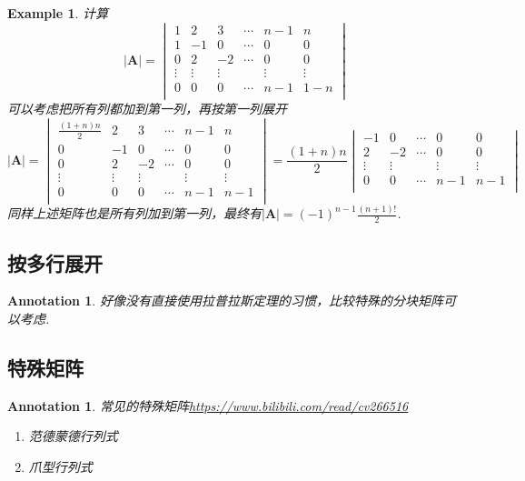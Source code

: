 \documentclass{article}
\newtheorem{example}[theorem]{Example}
\newtheorem{annotation}[theorem]{Annotation}
\newcommand{\hints}{{\color{blue} \text{hints}}}
\newcommand{\mbf}[1]{\bm{#1}}
\begin{document}
\begin{example}
\rm 计算
$$
|\mbf{A}| = \begin{vmatrix}
1 & 2 & 3 & \cdots & n-1 & n \\
1 & -1 & 0 & \cdots & 0 & 0 \\
0 & 2 & -2 & \cdots & 0 & 0 \\
\vdots & \vdots & \vdots &  & \vdots & \vdots \\
0 & 0 & 0 & \cdots & n-1 & 1-n \\
\end{vmatrix}
$$
\hints 可以考虑把所有列都加到第一列，再按第一列展开
$$
|\mbf{A}| = \begin{vmatrix}
\frac{(1+n)n}{2} & 2 & 3 & \cdots & n-1 & n \\
0 & -1 & 0 & \cdots & 0 & 0 \\
0 & 2 & -2 & \cdots & 0 & 0 \\
\vdots & \vdots & \vdots &  & \vdots & \vdots \\
0 & 0 & 0 & \cdots & n-1 & n-1 \\
\end{vmatrix} = \frac{(1+n)n}{2} \begin{vmatrix}
 -1 & 0 & \cdots & 0 & 0 \\
2 & -2 & \cdots & 0 & 0 \\
 \vdots & \vdots &  & \vdots & \vdots \\
  0 & 0 & \cdots & n-1 & n-1 \\
\end{vmatrix} 
$$
同样上述矩阵也是所有列加到第一列，最终有$|\mbf{A}| = (-1)^{n-1}\frac{(n+1)!}{2}$.
\end{example}

\subsection{按多行展开}

\begin{annotation}
\rm 好像没有直接使用拉普拉斯定理的习惯，比较特殊的分块矩阵可以考虑. 
\end{annotation}

\subsection{特殊矩阵}



\begin{annotation}
\rm 常见的特殊矩阵\url{https://www.bilibili.com/read/cv266516}
\begin{enumerate}
	\item 范德蒙德行列式
	\item 爪型行列式	
\end{enumerate}
\end{annotation}
\end{document}
